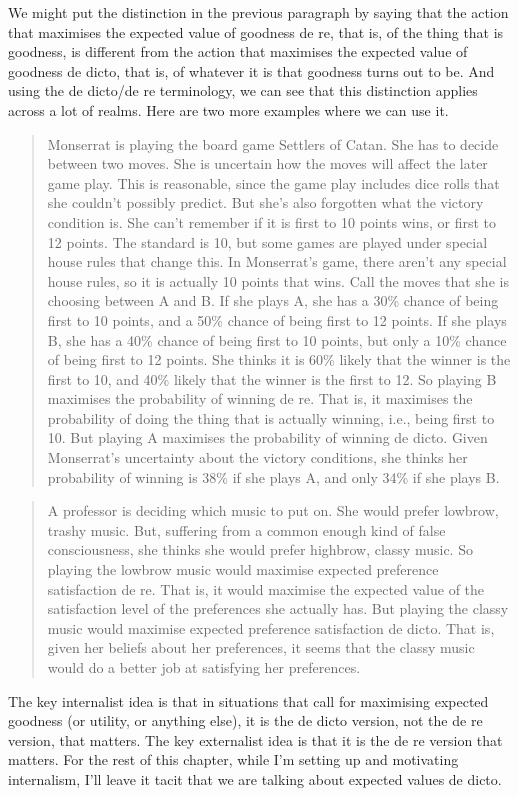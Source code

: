 We might put the distinction in the previous paragraph by saying that the action that maximises the expected value of goodness de re, that is, of the thing that is goodness, is different from the action that maximises the expected value of goodness de dicto, that is, of whatever it is that goodness turns out to be. And using the de dicto\slash de re terminology, we can see that this distinction applies across a lot of realms. Here are two more examples where we can use it.

\begin{quote}
\gls{Monserrat} is playing the board game Settlers of Catan. She has to decide between two moves. She is uncertain how the moves will affect the later game play. This is reasonable, since the game play includes dice rolls that she couldn't possibly predict. But she's also forgotten what the victory condition is. She can't remember if it is first to 10 points wins, or first to 12 points. The standard is 10, but some games are played under special house rules that change this. In \gls{Monserrat}'s game, there aren't any special house rules, so it is actually 10 points that wins. Call the moves that she is choosing between A and B. If she plays A, she has a 30\% chance of being first to 10 points, and a 50\% chance of being first to 12 points. If she plays B, she has a 40\% chance of being first to 10 points, but only a 10\% chance of being first to 12 points. She thinks it is 60\% likely that the winner is the first to 10, and 40\% likely that the winner is the first to 12. So playing B maximises the probability of winning de re. That is, it maximises the probability of doing the thing that is actually winning, i.e., being first to 10. But playing A maximises the probability of winning de dicto. Given \gls{Monserrat}'s uncertainty about the victory conditions, she thinks her probability of winning is 38\% if she plays A, and only 34\% if she plays B.
\end{quote}
\begin{quote}
A professor is deciding which music to put on. She would prefer lowbrow, trashy music. But, suffering from a common enough kind of false consciousness, she thinks she would prefer highbrow, classy music. So playing the lowbrow music would maximise expected preference satisfaction de re. That is, it would maximise the expected value of the satisfaction level of the preferences she actually has. But playing the classy music would maximise expected preference satisfaction de dicto. That is, given her beliefs about her preferences, it seems that the classy music would do a better job at satisfying her preferences.
\end{quote}
The key internalist idea is that in situations that call for maximising expected goodness (or utility, or anything else), it is the de dicto version, not the de re version, that matters. The key externalist idea is that it is the de re version that matters. For the rest of this chapter, while I'm setting up and motivating internalism, I'll leave it tacit that we are talking about expected values de dicto.

